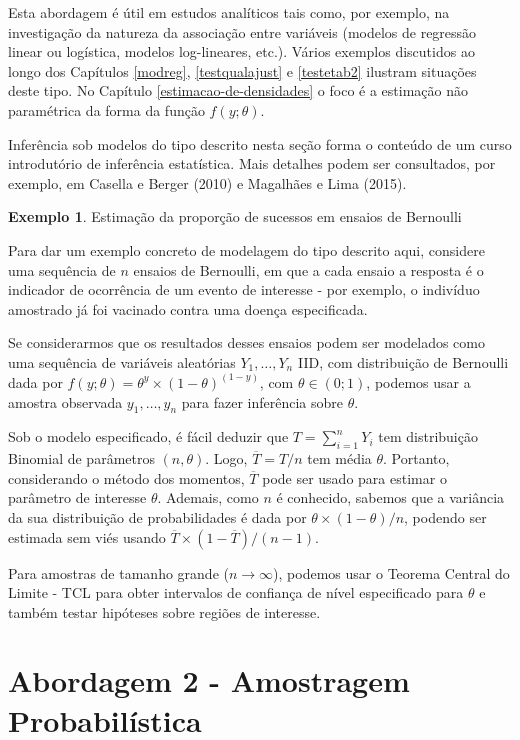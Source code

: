 \documentclass[
  12pt,
  brazilian,
]{book}
\theoremstyle{definition}
\theoremstyle{definition}
\newtheorem{example}{Exemplo}[chapter]
\theoremstyle{definition}
\theoremstyle{definition}
\theoremstyle{remark}
\begin{document}
Esta abordagem é útil em estudos analíticos tais como, por exemplo, na
investigação da natureza da associação entre variáveis (modelos de regressão
linear ou logística, modelos log-lineares, etc.). Vários exemplos discutidos ao
longo dos Capítulos \ref{modreg}, \ref{testqualajust} e \ref{testetab2}
ilustram situações deste tipo. No Capítulo \ref{estimacao-de-densidades} o foco é
a estimação não paramétrica da forma da função \(f(y;\theta)\).

Inferência sob modelos do tipo descrito nesta seção forma o conteúdo de um curso
introdutório de inferência estatística. Mais detalhes podem ser consultados, por
exemplo, em Casella e Berger (2010) e Magalhães e Lima (2015).

\begin{example}
\protect\hypertarget{exm:distbin}{}{\label{exm:distbin} }Estimação da proporção de sucessos em ensaios de Bernoulli
\end{example}
Para dar um exemplo concreto de modelagem do tipo descrito aqui, considere uma sequência
de \(n\) ensaios de Bernoulli, em que a cada ensaio a resposta é o indicador de ocorrência
de um evento de interesse - por exemplo, o indivíduo amostrado já foi vacinado contra uma doença especificada.

Se considerarmos que os resultados desses ensaios podem ser modelados como uma sequência de variáveis aleatórias \(Y_1, \ldots ,Y_n\) IID, com distribuição de Bernoulli dada por \(f(y;\theta)=\theta^y \times (1 - \theta)^{(1-y)}\), com \(\theta \in (0;1)\), podemos usar a amostra observada \(y_1, \ldots ,y_n\) para fazer inferência sobre \(\theta\).

Sob o modelo especificado, é fácil deduzir que \(T = \sum_{i=1}^n Y_i\) tem distribuição Binomial de parâmetros \((n, \theta)\). Logo, \(\overline{T} = T/n\) tem média \(\theta\). Portanto, considerando o método dos momentos, \(\overline{T}\) pode ser usado para estimar o parâmetro de interesse \(\theta\). Ademais, como \(n\) é conhecido, sabemos que a variância da sua distribuição de probabilidades é dada por \(\theta \times (1 - \theta) / n\), podendo ser estimada sem viés usando \(\overline{T} \times (1 - \overline{T}) / (n-1)\).

Para amostras de tamanho grande (\(n \rightarrow \infty\)), podemos usar o Teorema Central do Limite - TCL para obter intervalos de confiança de nível especificado para \(\theta\) e também testar hipóteses sobre regiões de interesse.

\hypertarget{abordagem-2---amostragem-probabiluxedstica}{%
\section{Abordagem 2 - Amostragem Probabilística}\label{abordagem-2---amostragem-probabiluxedstica}}
\end{document}
